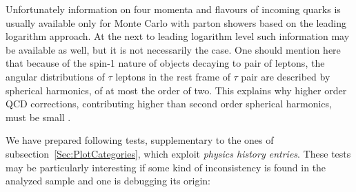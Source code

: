 \documentclass{article}
\begin{document}
Unfortunately information on four momenta and flavours of incoming quarks is usually 
available only for Monte Carlo with parton showers based on the leading
logarithm approach. At the next to leading logarithm level
\cite{Kleiss:1990jv} such information may be available as well, but it is not  
necessarily the case. One should mention here that because of the spin-1 nature 
of objects decaying to  pair of leptons, the  angular distributions of $\tau$ leptons in the rest frame of $\tau$ pair are 
described by spherical harmonics, of at 
most  the order of two. This explains why higher order QCD corrections,
contributing higher than second order spherical harmonics,
must be  small \cite{Mirkes:1992hu}. 

We have prepared following tests, supplementary to the ones
of subsection~\ref{Sec:PlotCategories}, which exploit {\it physics history entries}.
These tests may be particularly interesting if some kind of inconsistency is 
found in the analyzed sample
and one is debugging its origin:
\end{document}

